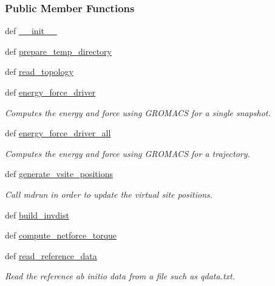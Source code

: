 \subsubsection*{Public Member Functions}
\begin{DoxyCompactItemize}
\item 
def \hyperlink{classforcebalance_1_1gmxio_1_1AbInitio__GMX_a1d03ae8104bcecacf96884058f2698af}{\-\_\-\-\_\-init\-\_\-\-\_\-}
\item 
def \hyperlink{classforcebalance_1_1gmxio_1_1AbInitio__GMX_ab2eac76585bdb8401812f0c8e465a44e}{prepare\-\_\-temp\-\_\-directory}
\item 
def \hyperlink{classforcebalance_1_1gmxio_1_1AbInitio__GMX_aba138ca4195a1737f2f00bd8c5f3ca07}{read\-\_\-topology}
\item 
def \hyperlink{classforcebalance_1_1gmxio_1_1AbInitio__GMX_a4bc31d1c02d47749d26b14779f025ebd}{energy\-\_\-force\-\_\-driver}
\begin{DoxyCompactList}\small\item\em Computes the energy and force using G\-R\-O\-M\-A\-C\-S for a single snapshot. \end{DoxyCompactList}\item 
def \hyperlink{classforcebalance_1_1gmxio_1_1AbInitio__GMX_a6e43c323b2286c546ff8afd3377f8808}{energy\-\_\-force\-\_\-driver\-\_\-all}
\begin{DoxyCompactList}\small\item\em Computes the energy and force using G\-R\-O\-M\-A\-C\-S for a trajectory. \end{DoxyCompactList}\item 
def \hyperlink{classforcebalance_1_1gmxio_1_1AbInitio__GMX_ae17e3c379d82935d725dd31f01df23e5}{generate\-\_\-vsite\-\_\-positions}
\begin{DoxyCompactList}\small\item\em Call mdrun in order to update the virtual site positions. \end{DoxyCompactList}\item 
def \hyperlink{classforcebalance_1_1abinitio_1_1AbInitio_a7475857193eefd4edd020d4f2a8fec17}{build\-\_\-invdist}
\item 
def \hyperlink{classforcebalance_1_1abinitio_1_1AbInitio_afbf86c26158a68cae7460b4106809fdd}{compute\-\_\-netforce\-\_\-torque}
\item 
def \hyperlink{classforcebalance_1_1abinitio_1_1AbInitio_aa73bedbf1e2cf19f2fa1e88815f1bd86}{read\-\_\-reference\-\_\-data}
\begin{DoxyCompactList}\small\item\em Read the reference ab initio data from a file such as qdata.\-txt. \end{DoxyCompactList}\item 

\end{DoxyCompactItemize}
